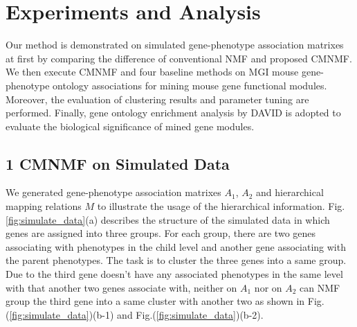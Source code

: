 \documentclass{bmcart}
\begin{document}
\section*{Experiments and Analysis}
Our method is demonstrated on simulated gene-phenotype association matrixes at first by comparing the difference of conventional NMF and proposed CMNMF. We then execute CMNMF and four baseline methods on MGI mouse gene-phenotype ontology associations for mining mouse gene functional modules. Moreover, the evaluation of clustering results and parameter tuning are performed. Finally, gene ontology enrichment analysis by DAVID is adopted to evaluate the biological significance of mined gene modules.

\subsection*{1 CMNMF on Simulated Data}
We generated gene-phenotype association matrixes $A_1$, $A_2$ and hierarchical mapping relations $M$ to illustrate the usage of the hierarchical information. Fig.\ref{fig:simulate_data}(a) describes the structure of the simulated data in which genes are assigned into three groups. For each group, there are two genes associating with phenotypes in the child level and another gene associating with the parent phenotypes. The task is to cluster the three genes into a same group. Due to the third gene doesn't have any associated phenotypes in the same level with that another two genes associate with, neither on $A_1$ nor on $A_2$ can NMF group the third gene into a same cluster with another two as shown in Fig.(\ref{fig:simulate_data})(b-1) and Fig.(\ref{fig:simulate_data})(b-2).
\end{document}
